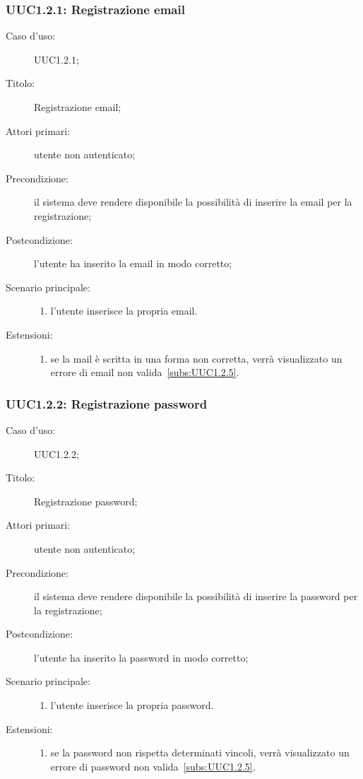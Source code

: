 \documentclass[../../../analisi-dei-requisiti.tex]{subfiles}
\begin{document}
\subsubsection{UUC1.2.1: Registrazione email}%
\label{subs:UUC1.2.1}
\begin{description}
  \item[Caso d’uso:] UUC1.2.1;
  \item[Titolo:] Registrazione email;
  \item[Attori primari:] utente non autenticato;
  \item[Precondizione:] il sistema deve rendere disponibile la possibilità di inserire la email per la registrazione;
  \item[Postcondizione:] l'utente ha inserito la email in modo corretto;
  \item[Scenario principale:]
        \begin{enumerate}
          \item l'utente inserisce la propria email.
        \end{enumerate}
  \item[Estensioni:]
        \begin{enumerate}
          \item se la mail è scritta in una forma non corretta, verrà visualizzato un errore di email non valida~\ref{subs:UUC1.2.5}.
        \end{enumerate}
\end{description}



\subsubsection{UUC1.2.2: Registrazione password}%
\label{subs:UUC1.2.2}
\begin{description}
  \item[Caso d’uso:] UUC1.2.2;
  \item[Titolo:] Registrazione password;
  \item[Attori primari:] utente non autenticato;
  \item[Precondizione:] il sistema deve rendere disponibile la possibilità di inserire la password per la registrazione;
  \item[Postcondizione:] l'utente ha inserito la password in modo corretto;
  \item[Scenario principale:]
        \begin{enumerate}
          \item l'utente inserisce la propria password.
        \end{enumerate}
  \item[Estensioni:]
        \begin{enumerate}
          \item se la password non rispetta determinati vincoli, verrà visualizzato un errore di password non valida~\ref{subs:UUC1.2.5}.
        \end{enumerate}
\end{description}
\end{document}
